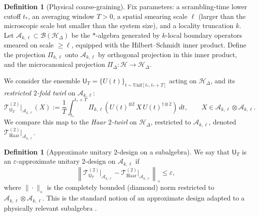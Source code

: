 \documentclass[11pt,a4paper]{article}
\theoremstyle{plain}
\theoremstyle{definition}
\newtheorem{definition}[theorem]{Definition}
\theoremstyle{remark}
\begin{document}
\begin{definition}[Physical coarse-graining]\label{def:CG}
Fix parameters: a scrambling-time lower cutoff $t_\ast$, an averaging window $T>0$, a spatial smearing scale $\ell$ (larger than the microscopic scale but smaller than the system size), and a locality truncation $k$.  Let $\mathscr{A}_{k,\ell}\subset \mathcal{B}(\mathcal{H}_\Delta)$ be the $*$-algebra generated by $k$-local boundary operators smeared on scale $\ge \ell$, equipped with the Hilbert--Schmidt inner product.  Define the projection $\Pi_{k,\ell}$ onto $\mathscr{A}_{k,\ell}$ by orthogonal projection in this inner product, and the microcanonical projection $\Pi_\Delta:\mathcal{H}\to\mathcal{H}_\Delta$.

We consider the ensemble $\mathsf{U}_{T}=\{U(t)\}_{t\sim \mathrm{Unif}[t_\ast,t_\ast+T]}$ acting on $\mathcal{H}_\Delta$, and its {\em restricted $2$-fold twirl} on $\mathscr{A}_{k,\ell}$:
\begin{equation}
  \mathcal{T}^{(2)}_{\mathsf{U}_T}\big|_{\mathscr{A}_{k,\ell}}(X)
  := \frac{1}{T}\int_{t_\ast}^{t_\ast+T}
   \Pi_{k,\ell}\!\left(U(t)^{\otimes 2}\, X \, U(t)^{\dagger\otimes 2}\right)\,dt,
  \qquad X\in \mathscr{A}_{k,\ell}\otimes \mathscr{A}_{k,\ell}.
\end{equation}
We compare this map to the {\em Haar $2$-twirl} on $\mathcal{H}_\Delta$, restricted to $\mathscr{A}_{k,\ell}$, denoted $\mathcal{T}^{(2)}_{\mathrm{Haar}}\big|_{\mathscr{A}_{k,\ell}}$.
\end{definition}

\begin{definition}[Approximate unitary $2$-design on a subalgebra]\label{def:approx-2design}
We say that $\mathsf{U}_{T}$ is an $\varepsilon$-approximate unitary $2$-design on $\mathscr{A}_{k,\ell}$ if
\begin{equation}
 \left\| \mathcal{T}^{(2)}_{\mathsf{U}_T}\big|_{\mathscr{A}_{k,\ell}} - \mathcal{T}^{(2)}_{\mathrm{Haar}}\big|_{\mathscr{A}_{k,\ell}} \right\|_{\diamond} \le \varepsilon,
\end{equation}
where $\|\cdot\|_\diamond$ is the completely bounded (diamond) norm restricted to $\mathscr{A}_{k,\ell}\otimes\mathscr{A}_{k,\ell}$.  This is the standard notion of an approximate design adapted to a physically relevant subalgebra \cite{Brandao:2016,RobertsYoshida:2017}.
\end{definition}
\end{document}
